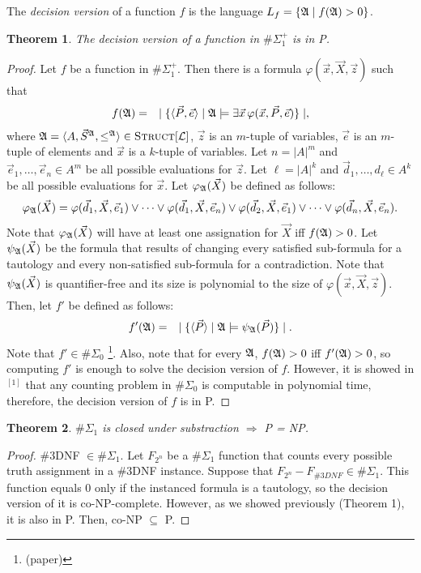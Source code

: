 \documentclass[12pt]{article}
\def\A{{\frak A}}
\def\L{{\cal L}}
\def\P{\vec{P}}
\def\S{\vec{S}}
\def\X{\vec{X}}
\def\d{\vec{d}} %
\def\e{\vec{e}} %
\def\x{\vec{x}} %
\def\z{\vec{z}} %
\newtheorem{theo}{Theorem}
\begin{document}
The {\em decision version} of a function $f$ is the language $L_f = \{\A \mid f(\A) > 0\}$.
\begin{theo}
The decision version of a function in $\#\Sigma_1^{+}$ is in \textsc{P}.
\end{theo}
\begin{proof}
Let $f$ be a function in $\#\Sigma_1^{+}$. Then there is a formula $\varphi(\x,\X,\z)$ such that
\begin{eqnarray*}
f(\A) &=& \mid \{ \langle\P,\e\rangle \mid \A \models \exists \x \, \varphi(\x,\P,\e) \} \mid,
\end{eqnarray*}
where $\A = \langle A, \S^{\A}, \leq^{\A} \rangle \in \textsc{Struct}[\L]$, $\z$ is an $m$-tuple of variables, $\e$ is an $m$-tuple of elements and $\x$ is a $k$-tuple of variables. Let $n = \vert A \vert^m$ and $\e_1,\dots,\e_n \in A^m$ be all possible evaluations for $\z$. Let $\ell = \vert A \vert^k$ and $\d_1,\dots,d_\ell\in A^k$ be all possible evaluations for $\x$. Let $\varphi_\A(\X)$ be defined as follows:
\begin{eqnarray*}
\varphi_\A(\X) = \varphi(\d_1,\X,\e_1) \vee \cdots \vee \varphi(\d_1,\X,\e_n) \vee \varphi(\d_2,\X,\e_1) \vee \cdots \vee \varphi(\d_n,\X,\e_n).
\end{eqnarray*}
Note that $\varphi_\A(\X)$ will have at least one assignation for $\X$ iff $f(\A)>0$. Let $\psi_\A(\X)$ be the formula that results of changing every satisfied sub-formula for a tautology and every non-satisfied sub-formula for a contradiction. Note that $\psi_\A(\X)$ is quantifier-free and its size is polynomial to the size of $\varphi(\x,\X,\z)$. Then, let $f'$ be defined as follows:
\begin{eqnarray*}
f'(\A) &=& \mid \{ \langle\P\rangle \mid \A \models \psi_\A(\P) \} \mid.
\end{eqnarray*}
Note that $f' \in\#\Sigma_0$ \footnote[1]{(paper)}. Also, note that for every $\A$, $f(\A) > 0$ iff $f'(\A) > 0$, so computing $f'$ is enough to solve the decision version of $f$. However, it is showed in $^{[1]}$ that any counting problem in $\#\Sigma_0$ is computable in polynomial time, therefore, the decision version of $f$ is in P.
\end{proof}

\begin{theo}
$\#\Sigma_1$ is closed under substraction $\Rightarrow$ P = NP.
\end{theo}
\begin{proof}
\#3DNF $\in \#\Sigma_1$. Let $F_{2^n}$ be a $\#\Sigma_1$ function that counts every possible truth assignment in a \#3DNF instance. Suppose that $F_{2^n}-F_{\#3DNF} \in \#\Sigma_1$. This function equals 0 only if the instanced formula is a tautology, so the decision version of it is co-NP-complete. However, as we showed previously (Theorem 1), it is also in P. Then, co-NP $\subseteq$ P.
\end{proof}
\end{document}
